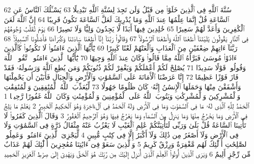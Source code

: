 {\tiny\colorbox{cl_aya}{62}} سُنَّةَ ٱللَّهِ فِى ٱلَّذِينَ خَلَوْا۟ مِن قَبْلُ وَلَن تَجِدَ لِسُنَّةِ ٱللَّهِ تَبْدِيلًا
{\tiny\colorbox{cl_aya}{63}} يَسْـَٔلُكَ ٱلنَّاسُ عَنِ ٱلسَّاعَةِ قُلْ إِنَّمَا عِلْمُهَا عِندَ ٱللَّهِ وَمَا يُدْرِيكَ لَعَلَّ ٱلسَّاعَةَ تَكُونُ قَرِيبًا
{\tiny\colorbox{cl_aya}{64}} إِنَّ ٱللَّهَ لَعَنَ ٱلْكَٰفِرِينَ وَأَعَدَّ لَهُمْ سَعِيرًا
{\tiny\colorbox{cl_aya}{65}} خَٰلِدِينَ فِيهَآ أَبَدًا لَّا يَجِدُونَ وَلِيًّا وَلَا نَصِيرًا
{\tiny\colorbox{cl_aya}{66}} يَوْمَ تُقَلَّبُ وُجُوهُهُمْ فِى ٱلنَّارِ يَقُولُونَ يَٰلَيْتَنَآ أَطَعْنَا ٱللَّهَ وَأَطَعْنَا ٱلرَّسُولَا۠
{\tiny\colorbox{cl_aya}{67}} وَقَالُوا۟ رَبَّنَآ إِنَّآ أَطَعْنَا سَادَتَنَا وَكُبَرَآءَنَا فَأَضَلُّونَا ٱلسَّبِيلَا۠
{\tiny\colorbox{cl_aya}{68}} رَبَّنَآ ءَاتِهِمْ ضِعْفَيْنِ مِنَ ٱلْعَذَابِ وَٱلْعَنْهُمْ لَعْنًا كَبِيرًا
{\tiny\colorbox{cl_aya}{69}} يَٰٓأَيُّهَا ٱلَّذِينَ ءَامَنُوا۟ لَا تَكُونُوا۟ كَٱلَّذِينَ ءَاذَوْا۟ مُوسَىٰ فَبَرَّأَهُ ٱللَّهُ مِمَّا قَالُوا۟ وَكَانَ عِندَ ٱللَّهِ وَجِيهًا
{\tiny\colorbox{cl_aya}{70}} يَٰٓأَيُّهَا ٱلَّذِينَ ءَامَنُوا۟ ٱتَّقُوا۟ ٱللَّهَ وَقُولُوا۟ قَوْلًا سَدِيدًا
{\tiny\colorbox{cl_aya}{71}} يُصْلِحْ لَكُمْ أَعْمَٰلَكُمْ وَيَغْفِرْ لَكُمْ ذُنُوبَكُمْ وَمَن يُطِعِ ٱللَّهَ وَرَسُولَهُۥ فَقَدْ فَازَ فَوْزًا عَظِيمًا
{\tiny\colorbox{cl_aya}{72}} إِنَّا عَرَضْنَا ٱلْأَمَانَةَ عَلَى ٱلسَّمَٰوَٰتِ وَٱلْأَرْضِ وَٱلْجِبَالِ فَأَبَيْنَ أَن يَحْمِلْنَهَا وَأَشْفَقْنَ مِنْهَا وَحَمَلَهَا ٱلْإِنسَٰنُ إِنَّهُۥ كَانَ ظَلُومًا جَهُولًا
{\tiny\colorbox{cl_aya}{73}} لِّيُعَذِّبَ ٱللَّهُ ٱلْمُنَٰفِقِينَ وَٱلْمُنَٰفِقَٰتِ وَٱلْمُشْرِكِينَ وَٱلْمُشْرِكَٰتِ وَيَتُوبَ ٱللَّهُ عَلَى ٱلْمُؤْمِنِينَ وَٱلْمُؤْمِنَٰتِ وَكَانَ ٱللَّهُ غَفُورًا رَّحِيمًۢا
{\tiny\colorbox{cl_aya}{1}} ٱلْحَمْدُ لِلَّهِ ٱلَّذِى لَهُۥ مَا فِى ٱلسَّمَٰوَٰتِ وَمَا فِى ٱلْأَرْضِ وَلَهُ ٱلْحَمْدُ فِى ٱلْءَاخِرَةِ وَهُوَ ٱلْحَكِيمُ ٱلْخَبِيرُ
{\tiny\colorbox{cl_aya}{2}} يَعْلَمُ مَا يَلِجُ فِى ٱلْأَرْضِ وَمَا يَخْرُجُ مِنْهَا وَمَا يَنزِلُ مِنَ ٱلسَّمَآءِ وَمَا يَعْرُجُ فِيهَا وَهُوَ ٱلرَّحِيمُ ٱلْغَفُورُ
{\tiny\colorbox{cl_aya}{3}} وَقَالَ ٱلَّذِينَ كَفَرُوا۟ لَا تَأْتِينَا ٱلسَّاعَةُ قُلْ بَلَىٰ وَرَبِّى لَتَأْتِيَنَّكُمْ عَٰلِمِ ٱلْغَيْبِ لَا يَعْزُبُ عَنْهُ مِثْقَالُ ذَرَّةٍ فِى ٱلسَّمَٰوَٰتِ وَلَا فِى ٱلْأَرْضِ وَلَآ أَصْغَرُ مِن ذَٰلِكَ وَلَآ أَكْبَرُ إِلَّا فِى كِتَٰبٍ مُّبِينٍ
{\tiny\colorbox{cl_aya}{4}} لِّيَجْزِىَ ٱلَّذِينَ ءَامَنُوا۟ وَعَمِلُوا۟ ٱلصَّٰلِحَٰتِ أُو۟لَٰٓئِكَ لَهُم مَّغْفِرَةٌ وَرِزْقٌ كَرِيمٌ
{\tiny\colorbox{cl_aya}{5}} وَٱلَّذِينَ سَعَوْ فِىٓ ءَايَٰتِنَا مُعَٰجِزِينَ أُو۟لَٰٓئِكَ لَهُمْ عَذَابٌ مِّن رِّجْزٍ أَلِيمٌ
{\tiny\colorbox{cl_aya}{6}} وَيَرَى ٱلَّذِينَ أُوتُوا۟ ٱلْعِلْمَ ٱلَّذِىٓ أُنزِلَ إِلَيْكَ مِن رَّبِّكَ هُوَ ٱلْحَقَّ وَيَهْدِىٓ إِلَىٰ صِرَٰطِ ٱلْعَزِيزِ ٱلْحَمِيدِ
